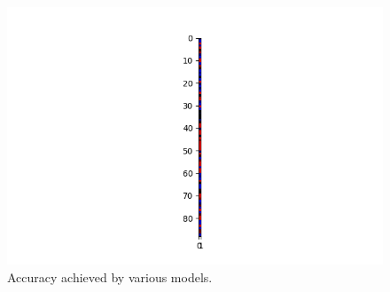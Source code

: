 \documentclass{article}
\begin{document}
\begin{figure}
    \centering
    \includegraphics{figures/regression_bias.png}
    \caption{Accuracy achieved by various models.}
\end{figure}
\end{document}
